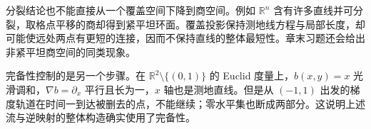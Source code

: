 分裂结论也不能直接从一个覆盖空间下降到商空间。例如 \(\mathbb R^n\) 含有许多直线并可分裂，取格点平移的商却得到紧平坦环面。覆盖投影保持测地线方程与局部长度，却可能使远处两点有更短的连接，因而不保持直线的整体最短性。章末习题还会给出非紧平坦商空间的同类现象。

\ProseParagraphBreak

完备性控制的是另一个步骤。在 \(\mathbb R^2\setminus\{(0,1)\}\) 的 Euclid 度量上，\(b(x,y)=x\) 光滑调和，\(\nabla b=\partial_x\) 平行且长为一，\(x\) 轴也是测地直线。但是从 \((-1,1)\) 出发的梯度轨道在时间一到达被删去的点，不能继续；零水平集也断成两部分。这说明上述流与逆映射的整体构造确实使用了完备性。
